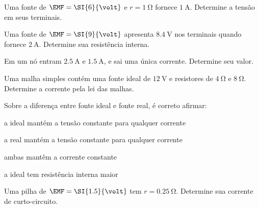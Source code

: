 \blocofixacao
\begin{questao}[1]{}

Uma fonte de $\EMF=\SI{6}{\volt}$ e $r=\SI{1}{\ohm}$ fornece
$\SI{1}{\ampere}$. Determine a tensão em seus terminais.


\end{questao}
\begin{questao}[1]{}

Uma fonte de $\EMF=\SI{9}{\volt}$ apresenta $\SI{8.4}{\volt}$ nos terminais
quando fornece $\SI{2}{\ampere}$. Determine sua resistência interna.


\end{questao}
\begin{questao}[1]{}

Em um nó entram $\SI{2.5}{\ampere}$ e $\SI{1.5}{\ampere}$, e sai uma única
corrente. Determine seu valor.


\end{questao}
\begin{questao}[1]{}

Uma malha simples contém uma fonte ideal de $\SI{12}{\volt}$ e resistores de
$\SI{4}{\ohm}$ e $\SI{8}{\ohm}$. Determine a corrente pela lei das malhas.


\end{questao}
\begin{questao}[1]{}

Sobre a diferença entre fonte ideal e fonte real, é correto afirmar:
\begin{alternativas}[2]
\item a ideal mantém a tensão constante para qualquer corrente
\item a real mantém a tensão constante para qualquer corrente
\item ambas mantêm a corrente constante
\item a ideal tem resistência interna maior
\end{alternativas}


\end{questao}
\begin{questao}[1]{}

Uma pilha de $\EMF=\SI{1.5}{\volt}$ tem $r=\SI{0.25}{\ohm}$. Determine sua
corrente de curto-circuito.


\end{questao}

